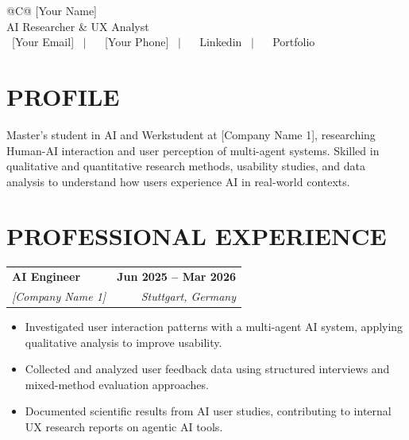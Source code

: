 \documentclass[a4paper,11pt]{article}
\makeatletter
\newcommand{\entryheader}[4]{%
  \begin{tabularx}{\textwidth}{@{}>{\RaggedRight\arraybackslash}X r@{}}
    \textbf{#1} & \textbf{#2} \\
    \textit{#3} & \textit{#4} \\
  \end{tabularx}%
}
\newenvironment{entrybullets}{%
  \begin{minipage}[t]{0.77\textwidth}
    \begin{itemize}[leftmargin=*,label=\textbullet,align=left]
}{%
    \end{itemize}
  \end{minipage}
}
\newcommand{\safehref}[2]{#2}
\let\href\safehref
\makeatother
\begin{document}
\pagestyle{empty}

\begin{tabularx}{\linewidth}{@{}C@{}}
  \Huge{[Your Name]}\\[10pt]
  
  \large{AI Researcher \& UX Analyst}\\[3pt]


  \href{mailto: [Your Email]}{\raisebox{-0.05\height}{\faEnvelope} \ [Your Email]} \ $|$ \
  \href{tel:[Your Phone]}{ \ [Your Phone]} \ $|$ \
  \href{[Your LinkedIn URL]}{\raisebox{-0.05\height}{\faLinkedin} \ Linkedin} \ $|$ \
  \href{[Your Portfolio URL]}{\raisebox{-0.05\height}{\faLink} \ Portfolio}\\
\end{tabularx}

\section*{PROFILE}
Master's student in AI and Werkstudent at [Company Name 1], researching Human-AI interaction and user perception of multi-agent systems. Skilled in qualitative and quantitative research methods, usability studies, and data analysis to understand how users experience AI in real-world contexts.


\section*{PROFESSIONAL EXPERIENCE}
\entryheader{AI Engineer}{Jun 2025 -- Mar 2026}{[Company Name 1]}{Stuttgart, Germany}
\begin{entrybullets}
  \item Investigated user interaction patterns with a multi-agent AI system, applying qualitative analysis to improve usability.
  \item Collected and analyzed user feedback data using structured interviews and mixed-method evaluation approaches.
  \item Documented scientific results from AI user studies, contributing to internal UX research reports on agentic AI tools.
\end{entrybullets}
\end{document}
